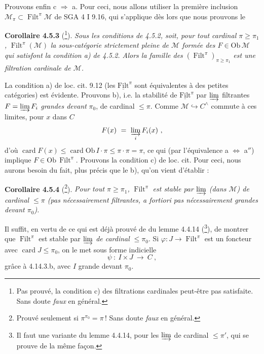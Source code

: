 \documentclass[11pt]{article}
\newcommand{\printedpage}[1]{\if\relax\detokenize{#1}\relax\else\marginpar{\footnotesize p.~#1}\fi}
\newcommand{\msp}[1]{\marginpar{\footnotesize [#1]}}
\newcommand{\Ob}{\mathrm{Ob}\,}
\newcommand{\card}{\operatorname{card}}
\newcommand{\Filt}{\operatorname{Filt}}
\newcommand{\uFilt}{\underline{\mathrm{Filt}}}
\begin{document}
Prouvons enfin c $\Longrightarrow$ a. Pour ceci, nous allons utiliser la première inclusion $\mathcal{M}_{\pi} \subset \Filt^{\pi}\mathcal{M}$ de SGA 4 I 9.16, qui s'applique dès lors que nous prouvons le

\textbf{Corollaire 4.5.3} (\footnote{Pas prouvé, la condition c) des filtrations cardinales peut-être pas satisfaite. Sans doute \textit{faux} en général.}). \textit{Sous les conditions de 4.5.2, soit, pour tout cardinal $\pi \geqslant \pi_1$,} $\Filt^{\pi}(\mathcal{M})$ \textit{la sous-catégorie strictement pleine de $\mathcal{M}$ formée des $F \in \Ob\mathcal{M}$ qui satisfont la condition a) de 4.5.2. Alors la famille des} $(\Filt^{\pi})_{\pi\geqslant\pi_1}$ \textit{est une}
\msp{page 110}
\textit{filtration cardinale de $\mathcal{M}$.}

La condition a) de loc. cit. 9.12 (les $\uFilt^{\pi}$ sont équivalentes à des petites catégories) est évidente. Prouvons b), i.e. la stabilité de $\uFilt^{\pi}$ par $\varinjlim$ filtrantes $F = \varinjlim F_i$ \textit{grandes devant} $\pi_0$, de cardinal $\leqslant \pi$. Comme $\mathcal{M} \hookrightarrow C^{\wedge}$ commute à ces limites, pour $x$ dans $C$
\[
F(x) \ =\ \varinjlim_{i} F_i(x)\ ,
\]
\printedpage{31}
d'où $\card F(x) \leqslant \card\Ob I \cdot \pi \leqslant \pi \cdot \pi = \pi$, ce qui (par l'équivalence a $\Longleftrightarrow$ a$''$) implique $F \in \Ob\Filt^{\pi}$. Prouvons la condition c) de loc. cit. Pour ceci, nous aurons besoin du fait, plus précis que le b), qu'on vient d'établir :

\textbf{Corollaire 4.5.4} (\footnote{Prouvé seulement si $\pi^{\pi_0} = \pi$\,! Sans doute \textit{faux} en général.}). \textit{Pour tout $\pi \geqslant \pi_1$,} $\Filt^{\pi}$ \textit{est stable par $\varinjlim$ (dans $\mathcal{M}$) de cardinal $\leqslant \pi$ (pas nécessairement filtrantes, a fortiori pas nécessairement grandes devant $\pi_0$).}

Il suffit, en vertu de ce qui est déjà prouvé de du lemme 4.4.14 (\footnote{Il faut une variante du lemme 4.4.14, pour les $\varinjlim$ de cardinal $\leqslant \pi'$, qui se prouve de la même façon.}), de montrer que $\Filt^{\pi}$ %
est stable par $\varinjlim$ \textit{de cardinal} $\leqslant \pi_0$. Si $\varphi : J \longrightarrow \Filt^{\pi}$ est un foncteur avec $\card J \leqslant \pi_0$, on le met sous forme indicielle
\[
\psi\ :\ I \times J \ \longrightarrow\ C\ ,
\]
grâce à 4.14.3.b, avec $I$ grande devant $\pi_0$.
\end{document}

